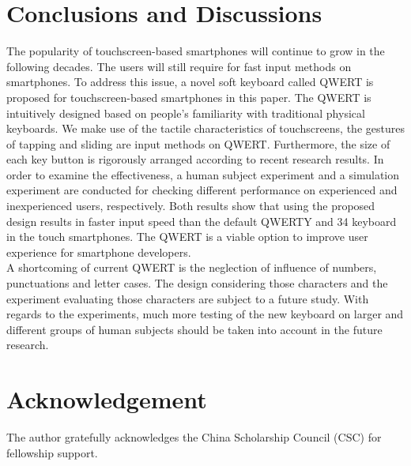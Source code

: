 \documentclass{singlecol-new}
\theoremstyle{TH}{
\newtheorem{lemma}{Lemma}
\newtheorem{theorem}[lemma]{Theorem}
\newtheorem{corrolary}[lemma]{Corrolary}
\newtheorem{conjecture}[lemma]{Conjecture}
\newtheorem{proposition}[lemma]{Proposition}
\newtheorem{claim}[lemma]{Claim}
\newtheorem{stheorem}[lemma]{Wrong Theorem}
\newtheorem{algorithm}{Algorithm}
}
\theoremstyle{THrm}{
\newtheorem{definition}{Definition}[section]
\newtheorem{question}{Question}[section]
\newtheorem{remark}{Remark}
\newtheorem{scheme}{Scheme}
}
\theoremstyle{THhit}{
\newtheorem{case}{Case}[section]
}
\begin{document}
\section{Conclusions and Discussions}

	The popularity of touchscreen-based smartphones will continue to grow in the following decades. The users will still require for fast input methods on smartphones. To address this issue, a novel soft keyboard called QWERT is proposed for touchscreen-based smartphones in this paper. The QWERT is intuitively designed based on people's familiarity with traditional physical keyboards. We make use of the tactile characteristics of touchscreens, the gestures of tapping and sliding are input methods on QWERT. Furthermore, the size of each key button is rigorously arranged according to recent research results. In order to examine the effectiveness, a human subject experiment and a simulation experiment are conducted for checking different performance on experienced and inexperienced users, respectively. Both results show that using the proposed design results in faster input speed than the default QWERTY and 34 keyboard in the touch smartphones. The QWERT is a viable option to improve user experience for smartphone developers. \\

A shortcoming of current QWERT is the neglection of influence of numbers, punctuations and letter cases. The design considering those characters and the experiment evaluating those characters are subject to a future study. With regards to the experiments, much more testing of the new keyboard on larger and different groups of human subjects should be taken into account in the future research.


\section*{Acknowledgement}
The author gratefully acknowledges the China Scholarship Council (CSC) for fellowship support.





\end{document}
